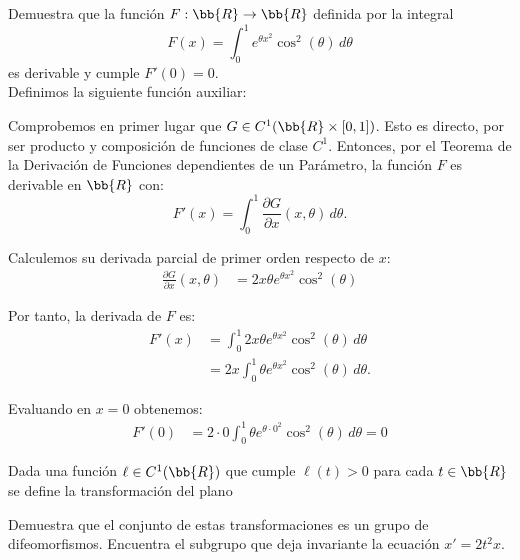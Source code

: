 \documentclass[12pt]{article}
\begin{document}
\begin{ejercicio}
    Demuestra que la función $F:\bb{R}\to \bb{R}$ definida por la integral
    \begin{equation*}
        F(x) = \int_0^1 e^{\theta x^2}\cos^2(\theta)\,d\theta
    \end{equation*}
    es derivable y cumple $F'(0) = 0$.\\

    Definimos la siguiente función auxiliar:

    Comprobemos en primer lugar que $G\in C^1(\bb{R}\times [0,1])$. Esto es directo, por ser producto y composición de funciones de clase $C^1$. Entonces, por el Teorema de la Derivación de Funciones dependientes de un Parámetro, la función $F$ es derivable en $\bb{R}$ con:
    \begin{equation*}
        F'(x) = \int_0^1 \frac{\partial G}{\partial x}(x,\theta)\,d\theta.
    \end{equation*}

    Calculemos su derivada parcial de primer orden respecto de $x$:
    \begin{align*}
        \frac{\partial G}{\partial x}(x,\theta) &= 2x\theta e^{\theta x^2}\cos^2(\theta)
    \end{align*}
    
    Por tanto, la derivada de $F$ es:
    \begin{align*}
        F'(x) &= \int_0^1 2x\theta e^{\theta x^2}\cos^2(\theta)\,d\theta\\
        &= 2x\int_0^1 \theta e^{\theta x^2}\cos^2(\theta)\,d\theta.
    \end{align*}

    Evaluando en $x=0$ obtenemos:
    \begin{align*}
        F'(0) &= 2\cdot 0\int_0^1 \theta e^{\theta\cdot 0^2}\cos^2(\theta)\,d\theta = 0
    \end{align*}
\end{ejercicio}

\begin{ejercicio}
    Dada una función $\ell\in C^1(\bb{R})$ que cumple $\ell(t) > 0$ para cada $t\in \bb{R}$ se define la transformación del plano

    Demuestra que el conjunto de estas transformaciones es un grupo de difeomorfismos. Encuentra el subgrupo que deja invariante la ecuación $x' = 2t^2x$.
\end{ejercicio}
\end{document}
